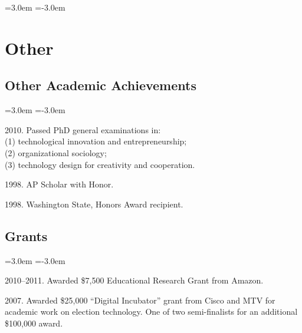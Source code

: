\documentclass[11pt]{article}
\newenvironment{cvlist}{
\begin{list}{}{\leftmargin=3.0em \itemindent=-3.0em}
  \setlength{\itemsep}{0pt}
  \setlength{\parskip}{0em}
  \setlength{\parsep}{1em}
  \setlength{\parindent}{0em}}
{\vspace{1em}
\end{list}}
\begin{document}
\begin{cvlist}
\end{cvlist}

\section{Other}
\subsection{Other Academic Achievements}

\begin{cvlist}
\item 2010. Passed PhD general examinations in:\\
  (1) technological innovation and entrepreneurship; \\
  (2) organizational sociology; \\
  (3) technology design for creativity and cooperation.
\item 1998. AP Scholar with Honor.
\item 1998. Washington State, Honors Award recipient.
\end{cvlist}

\subsection{Grants}

\begin{cvlist}
\item 2010--2011. Awarded \$7,500 Educational Research Grant from
  Amazon.

\item 2007. Awarded \$25,000 ``Digital Incubator'' grant from Cisco
  and MTV for academic work on election technology. One of two
  semi-finalists for an additional \$100,000 award.
\end{cvlist}

\end{document}
